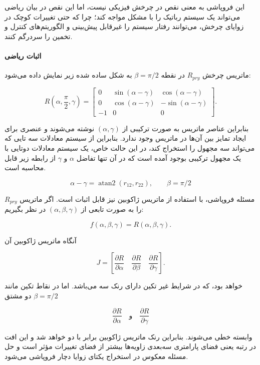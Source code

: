 \documentclass{article}
\begin{document}
این فروپاشی به معنی نقص در چرخش فیزیکی نیست، اما این نقص در بیان ریاضی می‌تواند یک سیستم رباتیک را با مشکل مواجه کند؛ چرا که حتی تغییرات کوچک در زوایای چرخش، می‌توانند رفتار سیستم را غیرقابل پیش‌بینی و الگوریتم‌های کنترل و تخمین را سردرگم کنند.

\paragraph{اثبات ریاضی}

ماتریس چرخش $R_{pry}$ در نقطه $\beta = \pi/2 $ به شکل ساده شده زیر نمایش داده می‌شود:

\[
R\!\left(\alpha,\frac{\pi}{2},\gamma\right)=
\begin{bmatrix}
	0 & \sin(\alpha-\gamma) & \cos(\alpha-\gamma)
	\\[4pt]
	0 & \cos(\alpha-\gamma) & -\sin(\alpha-\gamma)
	\\[4pt]
	-1 & 0 & 0
\end{bmatrix}.
\]

بنابراین عناصر ماتریس به صورت ترکیبی از $(\alpha, \gamma)$ نوشته می‌شوند و عنصری برای ایجاد تمایز بین آن‌ها در ماتریس وجود ندارد. بنابراین از سیستم معادلات سه تایی که می‌تواند سه مجهول را استخراج کند، در این حالت خاص، یک سیستم معادلات دوتایی با یک مجهول ترکیبی بوجود آمده است که در آن تنها تفاضل $\alpha$ و $\gamma$ از رابطه زیر قابل محاسبه است.

\[
\alpha - \gamma = \operatorname{atan2}(r_{12}, r_{22}), 
\qquad
\beta = \pi/2
\]

مسئله فروپاشی، با استفاده از ماتریس ژاکوبین نیز قابل اثبات است. اگر ماتریس $R_{pry}$ را به صورت تابعی از $(\alpha, \beta, \gamma)$ در نظر بگیریم:

\[
f(\alpha,\beta,\gamma) = R(\alpha,\beta,\gamma).
\]

آنگاه ماتریس ژاکوبین آن 

\[
J =
\left[
\frac{\partial R}{\partial \alpha}
\quad
\frac{\partial R}{\partial \beta}
\quad
\frac{\partial R}{\partial \gamma}
\right].
\]

خواهد بود، که در شرایط غیر تکین  دارای رنک   سه می‌باشد.
اما در نقاط تکین مانند $\beta = \pi/2 $ دو مشتق

\[
\frac{\partial R}{\partial \alpha}
\quad\text{و}\quad
\frac{\partial R}{\partial \gamma}
\]

وابسته خطی می‌شوند. بنابراین رنک ماتریس ژاکوبین برابر با دو خواهد شد و این افت در رتبه یعنی فضای پارامتری سه‌بعدی زاویه‌ها بیشتر از فضای تغییرات مؤثر است و حل مسئله معکوس در استخراج یکتای زوایا دچار فروپاشی می‌شود.
\end{document}
